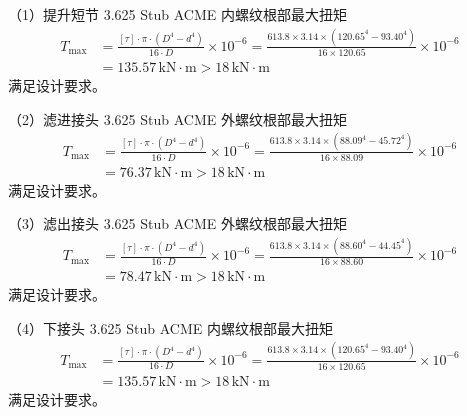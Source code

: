 （1）提升短节 3.625 Stub ACME 内螺纹根部最大扭矩
\begin{equation}
    \begin{aligned}
        T_{\max} &= \frac{[\tau] \cdot \pi \cdot (D^4 - d^4)}{16 \cdot D} \times 10^{-6}
                 = \frac{613.8 \times 3.14 \times (120.65^4 - 93.40^4)}{16 \times 120.65} \times 10^{-6} \\
                 &= 135.57\,\text{kN} \cdot \text{m} > 18\,\text{kN} \cdot \text{m}
    \end{aligned}
\end{equation}
满足设计要求。

（2）滤进接头 3.625 Stub ACME 外螺纹根部最大扭矩
\begin{equation}
    \begin{aligned}
        T_{\max} &= \frac{[\tau] \cdot \pi \cdot (D^4 - d^4)}{16 \cdot D} \times 10^{-6} 
                = \frac{613.8 \times 3.14 \times (88.09^4 - 45.72^4)}{16 \times 88.09} \times 10^{-6} \\
                &= 76.37\,\text{kN} \cdot \text{m} > 18\,\text{kN} \cdot \text{m}
    \end{aligned}
\end{equation}
满足设计要求。

（3）滤出接头 3.625 Stub ACME 外螺纹根部最大扭矩
\begin{equation}
    \begin{aligned}
        T_{\max} &= \frac{[\tau] \cdot \pi \cdot (D^4 - d^4)}{16 \cdot D} \times 10^{-6} 
                 = \frac{613.8 \times 3.14 \times (88.60^4 - 44.45^4)}{16 \times 88.60} \times 10^{-6} \\
                 &= 78.47\,\text{kN} \cdot \text{m} > 18\,\text{kN} \cdot \text{m}
    \end{aligned}
\end{equation}
满足设计要求。

（4）下接头 3.625 Stub ACME 内螺纹根部最大扭矩
\begin{equation}
    \begin{aligned}
        T_{\max} &= \frac{[\tau] \cdot \pi \cdot (D^4 - d^4)}{16 \cdot D} \times 10^{-6} 
             = \frac{613.8 \times 3.14 \times (120.65^4 - 93.40^4)}{16 \times 120.65} \times 10^{-6} \\
             &= 135.57\,\text{kN} \cdot \text{m} > 18\,\text{kN} \cdot \text{m}
    \end{aligned}
\end{equation}
满足设计要求。


